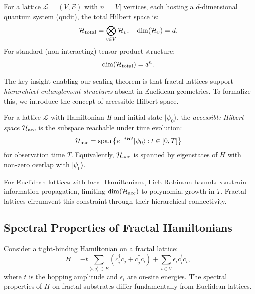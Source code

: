\begin{definition}
\label{def:quantum_lattice}
For a lattice $\mathcal{L} = (V, E)$ with $n = |V|$ vertices, each hosting a
$d$-dimensional quantum system (qudit), the total Hilbert space is:
\begin{equation}
\mathcal{H}_{\mathrm{total}} = \bigotimes_{v \in V} \mathcal{H}_v, \quad
\dim(\mathcal{H}_v) = d.
\end{equation}
For standard (non-interacting) tensor product structure:
\begin{equation}
\dim(\mathcal{H}_{\mathrm{total}}) = d^n.
\label{eq:standard_dim}
\end{equation}
\end{definition}

The key insight enabling our scaling theorem is that fractal lattices support
\emph{hierarchical entanglement structures} absent in Euclidean geometries.
To formalize this, we introduce the concept of accessible Hilbert space.

\begin{definition}
\label{def:accessible}
For a lattice $\mathcal{L}$ with Hamiltonian $H$ and initial state
$|\psi_0\rangle$, the \emph{accessible Hilbert space} $\mathcal{H}_{\mathrm{acc}}$
is the subspace reachable under time evolution:
\begin{equation}
\mathcal{H}_{\mathrm{acc}} = \mathrm{span}\left\{ e^{-iHt} |\psi_0\rangle :
t \in [0, T] \right\}
\end{equation}
for observation time $T$. Equivalently, $\mathcal{H}_{\mathrm{acc}}$ is spanned
by eigenstates of $H$ with non-zero overlap with $|\psi_0\rangle$.
\end{definition}

For Euclidean lattices with local Hamiltonians, Lieb-Robinson bounds
\cite{LiebRobinson1972} constrain information propagation, limiting
$\dim(\mathcal{H}_{\mathrm{acc}})$ to polynomial growth in $T$. Fractal lattices
circumvent this constraint through their hierarchical connectivity.

\subsection{Spectral Properties of Fractal Hamiltonians}

Consider a tight-binding Hamiltonian on a fractal lattice:
\begin{equation}
H = -t \sum_{\langle i,j \rangle \in E} \left( c_i^\dagger c_j +
c_j^\dagger c_i \right) + \sum_{i \in V} \epsilon_i c_i^\dagger c_i,
\label{eq:tight_binding}
\end{equation}
where $t$ is the hopping amplitude and $\epsilon_i$ are on-site energies. The
spectral properties of $H$ on fractal substrates differ fundamentally from
Euclidean lattices.

